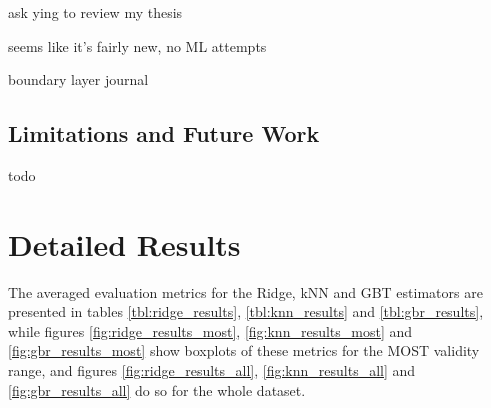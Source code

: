 \documentclass[a4paper]{book}
\begin{document}
ask ying to review my thesis

seems like it's fairly new, no ML attempts

boundary layer journal


\section{Limitations and Future Work}
todo

\appendix
\chapter{Detailed Results}
\label{apx:all_results}
The averaged evaluation metrics for the Ridge, kNN and GBT estimators are presented in tables \ref{tbl:ridge_results}, \ref{tbl:knn_results}
and \ref{tbl:gbr_results}, while figures \ref{fig:ridge_results_most}, \ref{fig:knn_results_most} and \ref{fig:gbr_results_most} show boxplots of these metrics for the MOST validity range, and figures \ref{fig:ridge_results_all}, \ref{fig:knn_results_all} and \ref{fig:gbr_results_all} do so for the whole dataset.
\end{document}
